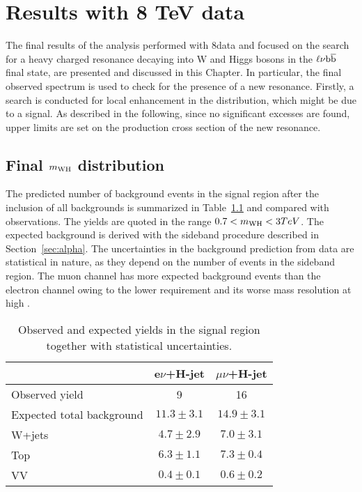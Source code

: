 \chapter{Results with 8 TeV data}
\label{ch:results8}

The final results of the analysis performed with 8\TeV data and focused on the search for a heavy charged resonance decaying into W and Higgs bosons in the $\ell\nu{\mathrm{b}\overline{\mathrm{b}}}$ final state, are presented and discussed in this Chapter.
In particular, the final observed \mWH spectrum is used to check for the presence of a new resonance.
Firstly, a search is conducted for local enhancement in the \mWH distribution, which might be due to a signal. 
As described in the following, since no significant excesses are found, upper limits are set on the production cross section of the new resonance.

\section{Final $m_{\rm WH}$ distribution}\label{sec:mWH8TeV}

The predicted number of background events in the signal region after the inclusion of all backgrounds is summarized in Table~\ref{tab:WHExpectedYields} and compared with observations.
The yields are quoted in the range $0.7 < m_{\rm WH} < 3 TeV$. The expected background is derived with the sideband procedure described in Section~\ref{sec:alpha}.
The uncertainties in the background prediction from data are statistical in nature, as they depend on the number of events in the sideband region.
The muon channel has more expected background events than the electron channel owing to the lower \ETmiss requirement and its worse mass resolution at high \pt.

\begin{table}[!htb]
\centering
\caption{
Observed and expected yields in the signal region together with statistical uncertainties.
}
\label{tab:WHExpectedYields}
\begin{tabular}{lcc}
   & e$\nu$+H-jet & {$\mu\nu$+H-jet}   \\
\hline \hline
 Observed yield     & 9   & 16  \\
 Expected total background   & $11.3 \pm 3.1$  & $14.9 \pm 3.1$   \\
\hline
 W+jets   & $4.7 \pm 2.9$  & $7.0 \pm 3.1$   \\
 Top  & $6.3 \pm 1.1$ & $7.3 \pm 0.4$ \\
 VV   & $0.4 \pm 0.1$  & $0.6 \pm 0.2$   \\
\hline \hline
\end{tabular}
\end{table}

